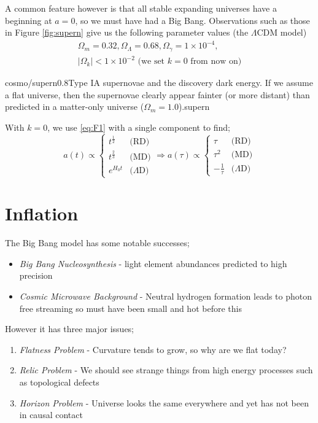 A common feature however is that all stable expanding universes have a beginning at $a = 0$, so we must have had a Big Bang. Observations such as those in Figure \ref{fig:supern} give us the following parameter values (the $\Lambda$CDM model)
\begin{multline*}
\Omega_m = 0.32, \Omega_{\Lambda} = 0.68, \Omega_{\gamma} = 1 \times 10^{-4}, \\ \left|\Omega_k\right| < 1 \times 10^{-2} \text{ (we set } k = 0 \text{ from now on)}
\end{multline*}
\begin{mygraphic}{cosmo/supern}{0.8}{Type IA supernovae and the discovery dark energy. If we assume a flat universe, then the supernovae clearly appear fainter (or more distant) than predicted in a matter-only universe ($\Omega_m = 1.0$).}{supern}\end{mygraphic}
\begin{definitionbox}
With $k = 0$, we use \eqref{eq:F1} with a single component to find;
\begin{equation}
a(t) \propto \begin{cases} t^{\tfrac{1}{2}} & \text{(RD)} \\ t^{\tfrac{2}{3}} & \text{(MD)} \\ e^{H_0 t} & \text{(}\Lambda\text{D)} \end{cases} \Longrightarrow a(\tau) \propto \begin{cases} \tau & \text{(RD)} \\ \tau^2 & \text{(MD)} \\ -\tfrac{1}{\tau} & \text{(}\Lambda\text{D)} \end{cases}
\end{equation}
\end{definitionbox}
\newpage
\section{Inflation}
The Big Bang model has some notable successes;
\begin{itemize}
\item \emph{Big Bang Nucleosynthesis} - light element abundances predicted to high precision
\item \emph{Cosmic Microwave Background} - Neutral hydrogen formation leads to photon free streaming so must have been small and hot before this 
\end{itemize}
However it has three major issues;
\begin{enumerate}
\item \emph{Flatness Problem} - Curvature tends to grow, so why are we flat today?
\item \emph{Relic Problem} - We should see strange things from high energy processes such as topological defects
\item \emph{Horizon Problem} - Universe looks the same everywhere and yet has not been in causal contact
\end{enumerate}
